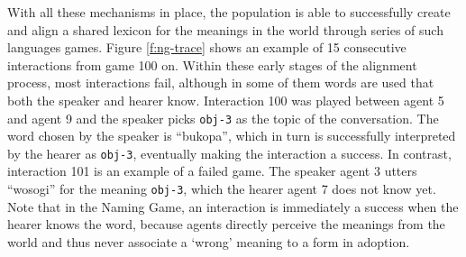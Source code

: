 With all these mechanisms in place, the population is able to
successfully create and align a shared lexicon for the meanings in the
world through series of such languages games. Figure \ref{f:ng-trace}
shows an example of 15 consecutive interactions from game 100
on. Within these early stages of the alignment process, most
interactions fail, although in some of them words are used that both
the speaker and hearer know. Interaction 100 was played between agent
5 and agent 9 and the speaker picks \texttt{obj-3} as the topic of the
conversation. The word chosen by the speaker is ``bukopa'', which in
turn is successfully interpreted by the hearer as \texttt{obj-3},
eventually making the interaction a success. In contrast, interaction
101 is an example of a failed game. The speaker agent 3 utters
``wosogi'' for the meaning \texttt{obj-3}, which the hearer agent 7
does not know yet. Note that in the Naming Game, an interaction is
immediately a success when the hearer knows the word, because agents
directly perceive the meanings from the world and thus never associate
a `wrong' meaning to a form in adoption.



